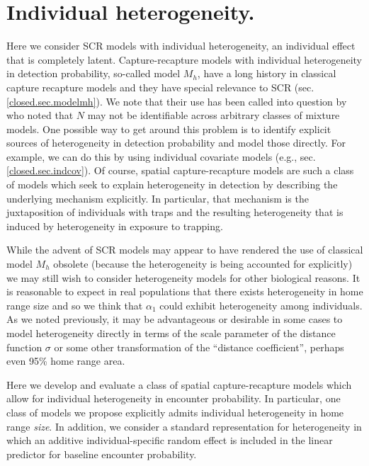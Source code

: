 \section{Individual heterogeneity.}

Here we consider SCR models with individual heterogeneity, an
individual effect that is
completely latent.  Capture-recapture models with individual
heterogeneity in detection probability, so-called model $M_{h}$, have
a long history in classical capture recapture models and they have
special relevance to SCR (sec. \ref{closed.sec.modelmh}).
We note that their use has been called into question by
\citet{link:2004euring} who noted that $N$ may not be identifiable across
arbitrary classes of mixture models.  One possible way to get around
this problem is to identify explicit sources of heterogeneity in
detection probability and model those directly. For example, we can do
this by using individual covariate models (e.g.,
sec. \ref{closed.sec.indcov}). Of course, spatial capture-recapture
models are such a class of models which seek to explain heterogeneity
in detection by describing the underlying mechanism explicitly. In
particular, that mechanism is the juxtaposition of individuals with
traps and the resulting heterogeneity that is induced by heterogeneity
in exposure to trapping.

While the advent of SCR models may appear to have rendered the use of
classical model $M_h$ obsolete (because the heterogeneity is being
accounted for explicitly) we may still wish to consider
heterogeneity models for other biological reasons.
It is reasonable
to expect in real populations that there exists
heterogeneity in home range size and so we think that $\alpha_{1}$
could exhibit heterogeneity among individuals.  As we noted
previously, it may be advantageous or desirable in some cases to model
heterogeneity directly in terms of the scale parameter of the distance
function $\sigma$ or
some other transformation of the ``distance coefficient'', perhaps
even 95\% home range area.

Here we develop and evaluate a class of spatial capture-recapture
models which allow for individual heterogeneity in encounter
probability.  In particular, one class of models we propose explicitly
admits individual heterogeneity in home range {\it size}. In addition,
we consider a standard representation for heterogeneity in which an
additive individual-specific random effect is included in the linear
predictor for baseline encounter probability.  

